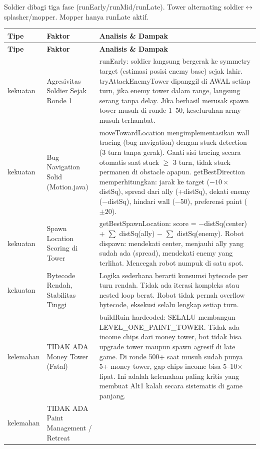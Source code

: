 \documentclass{article}
\begin{document}
\begin{enumerate}[label=\alph*.]

Soldier dibagi tiga fase (runEarly/runMid/runLate). Tower alternating soldier$\leftrightarrow$splasher/mopper. Mopper hanya runLate aktif.

\begin{longtable}{|p{2cm}|p{3.5cm}|p{8.5cm}|}
\hline
\textbf{Tipe} & \textbf{Faktor} & \textbf{Analisis \& Dampak} \\
\hline
\endfirsthead
\hline
\textbf{Tipe} & \textbf{Faktor} & \textbf{Analisis \& Dampak} \\
\hline
\endhead
\hline
\endfoot
kekuatan
& Agresivitas Soldier Sejak Ronde 1
& runEarly: soldier langsung bergerak ke symmetry target (estimasi posisi enemy base) sejak lahir.
tryAttackEnemyTower dipanggil di AWAL setiap turn, jika enemy tower dalam range, langsung serang tanpa delay.
Jika berhasil merusak spawn tower musuh di ronde 1--50, keseluruhan army musuh terhambat. \\
\hline
kekuatan
& Bug Navigation Solid (Motion.java)
& moveTowardLocation mengimplementasikan wall tracing (bug navigation) dengan stuck detection (3 turn tanpa gerak).
Ganti sisi tracing secara otomatis saat stuck $\geq$ 3 turn, tidak stuck permanen di obstacle apapun.
getBestDirection memperhitungkan: jarak ke target ($-10\times$distSq), spread dari ally (+distSq), dekati enemy ($-$distSq), hindari wall ($-50$), preferensi paint ($\pm 20$). \\
\hline
kekuatan
& Spawn Location Scoring di Tower
& getBestSpawnLocation: score = $-$distSq(center) + $\sum$ distSq(ally) $-$ $\sum$ distSq(enemy).
Robot dispawn: mendekati center, menjauhi ally yang sudah ada (spread), mendekati enemy yang terlihat.
Mencegah robot numpuk di satu spot. \\
\hline
kekuatan
& Bytecode Rendah, Stabilitas Tinggi
& Logika sederhana berarti konsumsi bytecode per turn rendah.
Tidak ada iterasi kompleks atau nested loop berat.
Robot tidak pernah overflow bytecode, eksekusi selalu lengkap setiap turn. \\
\hline
kelemahan
& TIDAK ADA Money Tower (Fatal)
& buildRuin hardcoded: SELALU membangun LEVEL\_ONE\_PAINT\_TOWER.
Tidak ada income chips dari money tower, bot tidak bisa upgrade tower maupun spawn agresif di late game.
Di ronde 500+ saat musuh sudah punya 5+ money tower, gap chips income bisa 5--10$\times$ lipat.
Ini adalah kelemahan paling kritis yang membuat Alt1 kalah secara sistematis di game panjang. \\
\hline
kelemahan
& TIDAK ADA Paint Management / Retreat

\end{longtable}
\end{enumerate}
\end{document}
